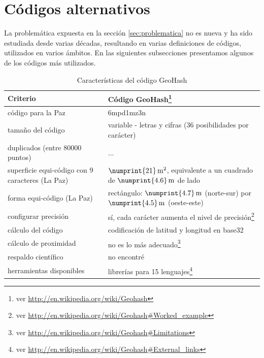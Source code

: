 \documentclass[letterpaper]{article}
\begin{document}
\section{Códigos alternativos}

La problemática expuesta en la sección \ref{sec:problematica} no es 
nueva y ha sido estudiada desde varias décadas, resultando en varias 
definiciones de códigos, utilizados en varios ámbitos. En las 
siguientes subsecciones presentamos algunos de los códigos más 
utilizados.

\begin{table}
	\centering
	\begin{tabu} to 
		\hline
		Criterio & Código GeoHash\footnote{ver \url{http://en.wikipedia.org/wiki/Geohash}} \\
		\hline
		código para la Paz & 6mpd1mz3n \\
		\hline
		tamaño del código & variable - letras y cifras (36 
		posibilidades por carácter) \\
		\hline
		duplicados (entre 80000 puntos) & ... \\
		\hline
		superficie equi-código con 9 caracteres (La Paz) & 
		\(\numprint{21}\,\mathrm{m^{2}}\), 
		equivalente a un cuadrado de \(\numprint{4.6}\,\mathrm{m}\) de lado \\
		\hline
		forma equi-código (La Paz) & rectángulo: 
		\(\numprint{4.7}\,\mathrm{m}\) (norte-sur) por 
		\(\numprint{4.5}\,\mathrm{m}\) (oeste-este) \\
		\hline
		configurar precisión & sí, cada 
		carácter aumenta el nivel de precisión\footnote{ver 
		\url{http://en.wikipedia.org/wiki/Geohash\#Worked_example}} \\
		\hline
		cálculo del código & codificación de latitud y longitud en 
		base32 \\
		cálculo de proximidad & no es lo más adecuado\footnote{ver 
		\url{http://en.wikipedia.org/wiki/Geohash\#Limitations}} \\
		\hline
		respaldo científico & no encontré \\
		\hline
		herramientas disponibles & librerías para 15 lenguajes\footnote{ver 
		\url{http://en.wikipedia.org/wiki/Geohash\#External_links}} \\
		\hline
	\end{tabu}
	\caption{Características del código GeoHash}
	\label{tab:carac_geohash}
\end{table}
\end{document}
